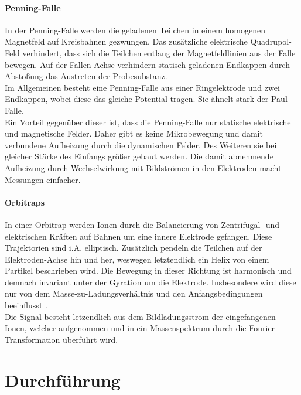 \documentclass[numbers=noenddot,a4paper,notitlepage,twoside,BCOR15mm]{scrartcl}
\begin{document}
				\paragraph{Penning-Falle}
					In der Penning-Falle werden die geladenen Teilchen in einem homogenen Magnetfeld auf Kreisbahnen gezwungen. Das zusätzliche elektrische Quadrupol-Feld verhindert, dass sich die Teilchen entlang der Magnetfeldlinien aus der Falle bewegen. Auf der Fallen-Achse verhindern statisch geladenen Endkappen durch Abstoßung das Austreten der Probesubstanz.\\
					Im Allgemeinen besteht eine Penning-Falle aus einer Ringelektrode und zwei Endkappen, wobei diese das gleiche Potential tragen. Sie ähnelt stark der Paul-Falle.\\
					Ein Vorteil gegenüber dieser ist, dass die Penning-Falle nur statische elektrische und magnetische Felder. Daher gibt es keine Mikrobewegung und damit verbundene Aufheizung durch die dynamischen Felder. Des Weiteren sie bei gleicher Stärke des Einfangs größer gebaut werden. Die damit abnehmende Aufheizung durch Wechselwirkung mit Bildströmen in den Elektroden macht Messungen einfacher.	

				\paragraph{Orbitraps}
					In einer Orbitrap werden Ionen durch die Balancierung von Zentrifugal- und elektrischen Kräften auf Bahnen um eine innere Elektrode gefangen. Diese Trajektorien sind i.A. elliptisch. Zusätzlich pendeln die Teilchen auf der Elektroden-Achse hin und her, weswegen letztendlich ein Helix von einem Partikel beschrieben wird. Die Bewegung in dieser Richtung ist harmonisch und demnach invariant unter der Gyration um die Elektrode.  Insbesondere wird diese nur von dem Masse-zu-Ladungsverhältnis und den Anfangsbedingungen beeinflusst .\\
					Die Signal besteht letzendlich aus dem Bildladungsstrom der eingefangenen Ionen, welcher aufgenommen und in ein Massenspektrum durch die Fourier-Transformation überführt wird.

	\newpage
	\section{Durchführung}
\end{document}
